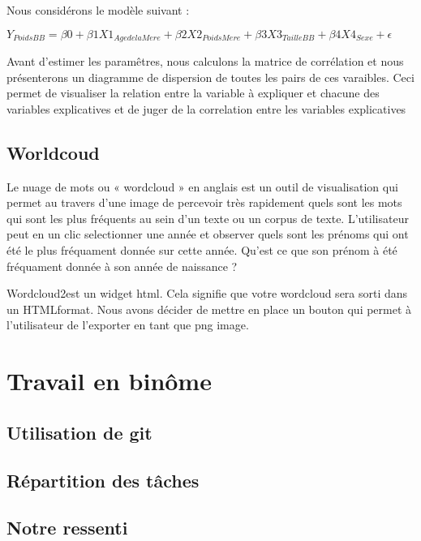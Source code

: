 \documentclass[
]{article}
\begin{document}
Nous considérons le modèle suivant :

\(Y_{PoidsBB} = \beta0 + \beta1 X1_{AgedelaMere} + \beta2 X2_{PoidsMere} + \beta3X3_{TailleBB} + \beta4X4_{Sexe} + \epsilon\)

Avant d'estimer les paramêtres, nous calculons la matrice de corrélation
et nous présenterons un diagramme de dispersion de toutes les pairs de
ces varaibles. Ceci permet de visualiser la relation entre la variable à
expliquer et chacune des variables explicatives et de juger de la
correlation entre les variables explicatives

\hypertarget{worldcoud}{%
\subsection{Worldcoud}\label{worldcoud}}

Le nuage de mots ou « wordcloud » en anglais est un outil de
visualisation qui permet au travers d'une image de percevoir très
rapidement quels sont les mots qui sont les plus fréquents au sein d'un
texte ou un corpus de texte. L'utilisateur peut en un clic selectionner
une année et observer quels sont les prénoms qui ont été le plus
fréquament donnée sur cette année. Qu'est ce que son prénom à été
fréquament donnée à son année de naissance ?

Wordcloud2est un widget html. Cela signifie que votre wordcloud sera
sorti dans un HTMLformat. Nous avons décider de mettre en place un
bouton qui permet à l'utilisateur de l'exporter en tant que png image.

\hypertarget{travail-en-binuxf4me}{%
\section{Travail en binôme}\label{travail-en-binuxf4me}}

\hypertarget{utilisation-de-git}{%
\subsection{Utilisation de git}\label{utilisation-de-git}}

\hypertarget{ruxe9partition-des-tuxe2ches}{%
\subsection{Répartition des tâches}\label{ruxe9partition-des-tuxe2ches}}

\hypertarget{notre-ressenti}{%
\subsection{Notre ressenti}\label{notre-ressenti}}
\end{document}
